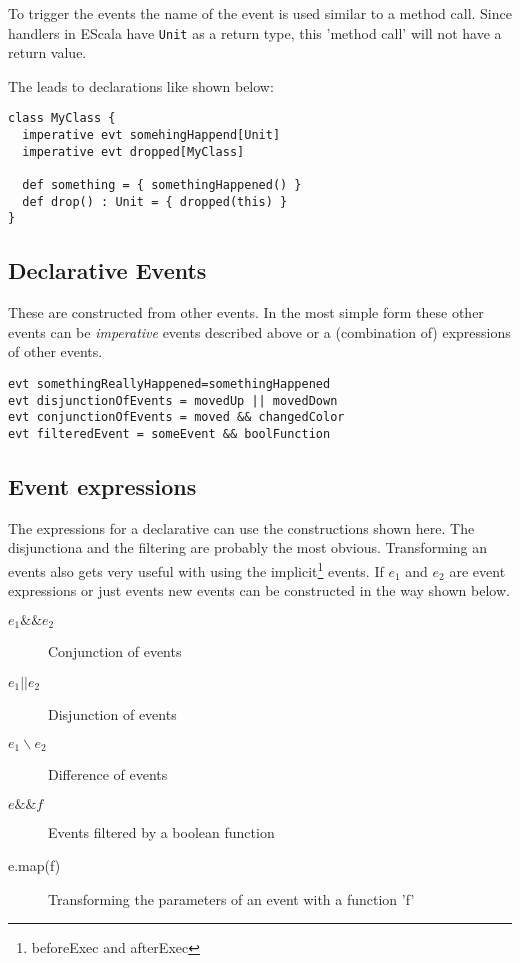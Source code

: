 \documentclass{article}
\newcommand{\escala}[0]{EScala }
\begin{document}
To trigger the events the name of the event is used similar to a method
call. Since handlers in \escala have {\tt Unit} as a return type, this
'method call' will not have a return value.

The leads to declarations like shown below:
\begin{lstlisting}
class MyClass {
  imperative evt somehingHappend[Unit]
  imperative evt dropped[MyClass]
  
  def something = { somethingHappened() }
  def drop() : Unit = { dropped(this) }
}
\end{lstlisting}

\subsection{Declarative Events}
These are constructed from other events. In the most simple form these
other events can be \emph{imperative} events described above or a
(combination of) expressions of other events.

\begin{lstlisting}
evt somethingReallyHappened=somethingHappened
evt disjunctionOfEvents = movedUp || movedDown
evt conjunctionOfEvents = moved && changedColor
evt filteredEvent = someEvent && boolFunction 
\end{lstlisting}


\subsection{Event expressions}

The expressions for a declarative can use the constructions shown
here. The disjunctiona and the filtering are probably the most
obvious. Transforming an events also gets very useful with using
the implicit\footnote{beforeExec and afterExec} events. If $e_1$
and $e_2$ are event expressions or just events new events can
be constructed in the way shown below.

\begin{description}
\item [ $e_1 \&\& e_2$ ] Conjunction of events
\item [ $e_1 || e_2$] Disjunction of events
\item [ $e_1 \backslash e_2$ ] Difference of events
\item [ $ e \&\& f $] Events filtered by a boolean function
\item [ e.map(f) ] Transforming the parameters of an event with a function 'f'
\end{description}
\end{document}
